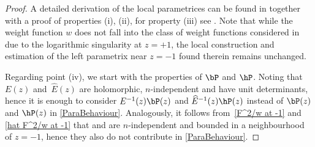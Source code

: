 \begin{proof}
A detailed derivation of the local parametrices can be found in \cite[Section~6]{KMVV} together with a proof of properties (i), (ii), for property (iii) see \cite[Section~7]{KMVV}. Note that while the weight function $w$ does not fall into the class of weight functions considered in \cite{KMVV} due to the logarithmic singularity at $z = +1$, the local construction and estimation of the left parametrix near $z = -1$ found therein remains unchanged.

Regarding point (iv), we start with the properties of $\bP$ and $\hP$. Noting that $E(z)$ and~$\widehat E(z)$ are holomorphic, $n$-independent and have unit determinants, hence it is enough to consider $E^{-1}(z)\bP(z)$ and $\widehat E^{-1}(z)\hP(z)$ instead of $\bP(z)$ and $\hP(z)$ in \eqref{ParaBehaviour}. Analogously, it follows from~\eqref{F^2/w at -1} and \eqref{hat F^2/w at -1} that  and  are $n$-independent and bounded in a neighbourhood of $z = -1$, hence they also do not contribute in \eqref{ParaBehaviour}.


\end{proof}
